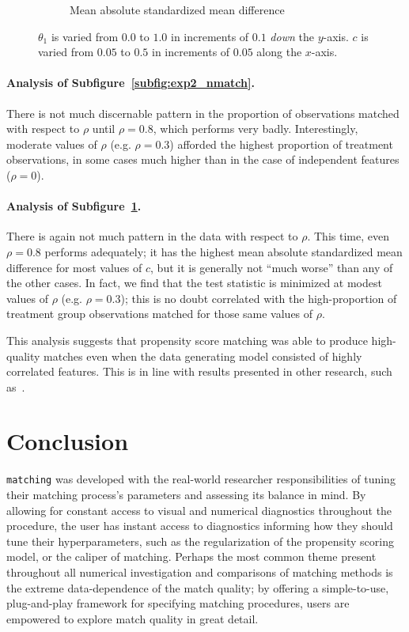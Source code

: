 \documentclass[11pt]{extarticle}
\begin{document}
\begin{figure}[h!]
\begin{center}
\begin{subfigure}[t]{0.49\textwidth}
        \caption{Mean absolute standardized mean difference}
        \label{subfig:exp2_mean_abs_smd}
    \end{subfigure}
    \caption{$\theta_1$ is varied from $0.0$ to $1.0$ in increments of $0.1$ \emph{down} the $y$-axis. $c$ is varied from $0.05$ to $0.5$ in increments of $0.05$ along the $x$-axis.}
    \label{fig:exp2}
  \end{center}
\end{figure}
\paragraph{Analysis of Subfigure~\ref{subfig:exp2_nmatch}.} There is not much discernable pattern in the proportion of observations matched with respect to $\rho$ until $\rho=0.8$, which performs very badly. Interestingly, moderate values of $\rho$ (e.g. $\rho=0.3$) afforded the highest proportion of treatment observations, in some cases much higher than in the case of independent features ($\rho = 0$).
\paragraph{Analysis of Subfigure~\ref{subfig:exp2_mean_abs_smd}.} There is again not much pattern in the data with respect to $\rho$. This time, even $\rho=0.8$ performs adequately; it has the highest mean absolute standardized mean difference for most values of $c$, but it is generally not ``much worse'' than any of the other cases. In fact, we find that the test statistic is minimized at modest values of $\rho$ (e.g. $\rho=0.3$); this is no doubt correlated with the high-proportion of treatment group observations matched for those same values of $\rho$.

This analysis suggests that propensity score matching was able to produce high-quality matches even when the data generating model consisted of highly correlated features. This is in line with results presented in other research, such as~\textcite{austin_optimal_2011}.

\section{Conclusion}

\texttt{matching} was developed with the real-world researcher responsibilities of tuning their matching process's parameters and assessing its balance in mind. By allowing for constant access to visual and numerical diagnostics throughout the procedure, the user has instant access to diagnostics informing how they should tune their hyperparameters, such as the regularization of the propensity scoring model, or the caliper of matching.
Perhaps the most common theme present throughout all numerical investigation and comparisons of matching methods is the extreme data-dependence of the match quality; by offering a simple-to-use, plug-and-play framework for specifying matching procedures, users are empowered to explore match quality in great detail.
\end{document}
